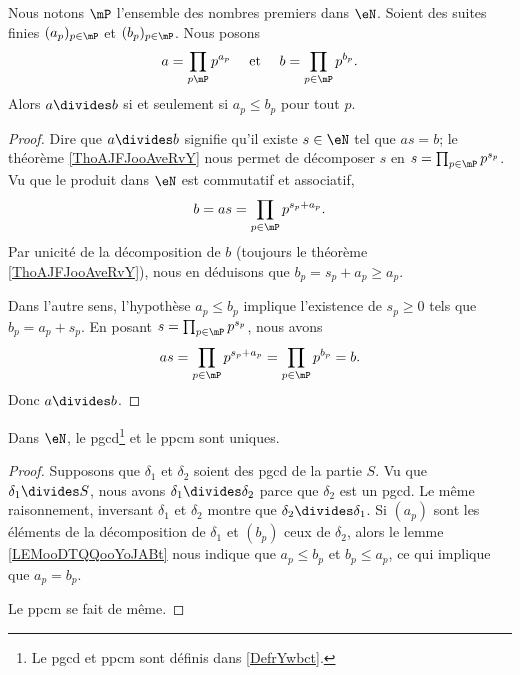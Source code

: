 \begin{lemma}        \label{LEMooDTQQooYoJABt}
    Nous notons \( \mP\) l'ensemble des nombres premiers dans \( \eN\). Soient des suites finies \( (a_p)_{p\in \mP}\) et \( (b_p)_{p\in \mP}\). Nous posons
    \begin{equation}
        \begin{aligned}[]
            a&=\prod_{ p\mP}p^{a_p}&\text{ et }&&b=\prod_{ p\in \mP}p^{b_p}.
        \end{aligned}
    \end{equation}
    Alors \( a\divides b\) si et seulement si \( a_p\leq b_p\) pour tout \( p\).
\end{lemma}

\begin{proof}
    Dire que \( a\divides b\) signifie qu'il existe \( s\in \eN\) tel que \( as=b\); le théorème \ref{ThoAJFJooAveRvY} nous permet de décomposer \( s\) en \( s=\prod_{p\in\mP}p^{s_p}\). Vu que le produit dans \( \eN\) est commutatif et associatif,
    \begin{equation}
        b=as=\prod_{p\in\mP}p^{s_p+a_p}.
    \end{equation}
    Par unicité de la décomposition de \( b\) (toujours le théorème \ref{ThoAJFJooAveRvY}), nous en déduisons que \( b_p=s_p+a_p\geq a_p\).

    Dans l'autre sens, l'hypothèse \( a_p\leq b_p\) implique l'existence de \( s_p\geq 0\) tels que \( b_p=a_p+s_p\). En posant \( s=\prod_{p\in\mP}p^{s_p}\), nous avons
    \begin{equation}
        as=\prod_{p\in\mP}p^{s_p+a_p}=\prod_{p\in \mP}p^{b_p}=b.
    \end{equation}
    Donc \( a\divides b\).
\end{proof}

\begin{lemma}       \label{LEMooBJVJooFyuFeN}
    Dans \( \eN\), le pgcd\footnote{Le pgcd et ppcm sont définis dans \ref{DefrYwbct}.} et le ppcm sont uniques.
\end{lemma}

\begin{proof}
    Supposons que \( \delta_1\) et \( \delta_2\) soient des pgcd de la partie \( S\). Vu que \( \delta_1\divides S\), nous avons \( \delta_1\divides \delta_2\) parce que \( \delta_2\) est un pgcd. Le même raisonnement, inversant \( \delta_1\) et \( \delta_2\) montre que \( \delta_2\divides \delta_1\). Si \( (a_p)\) sont les éléments de la décomposition de \( \delta_1\) et \( (b_p)\) ceux de \( \delta_2\), alors le lemme \ref{LEMooDTQQooYoJABt} nous indique que \( a_p\leq b_p\) et \( b_p\leq a_p\), ce qui implique que \( a_p=b_p\).

    Le ppcm se fait de même.
\end{proof}

